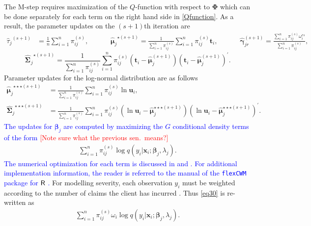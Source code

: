 \documentclass[11pt,letterpaper]{article}
\numberwithin{equation}{section}
\numberwithin{equation}{section}
\numberwithin{equation}{section}
\begin{document}
The M-step requires maximization of the $Q$-function with respect to $\bm \Phi$ which can be done separately for each term on the right hand side in \eqref{Qfunction}. %
As a result, the parameter updates on the $(s+1)$th iteration are
\begin{align*}
{\hat{\tau}_j}^{(s+1)}&=\frac{1}{n} \sum_{i=1}^n \pi_{ij}^{(s)}, && && {\hat{\bm{\mu}}_j}^{\star (s+1)}=\frac{1}{\sum_{i=1}^n \pi_{ij}^{(s)}} \sum_{i=1}^n \pi_{ij}^{(s)}\bm t_i, &&  && {\hat{\bm \gamma}^{(s+1)}_{jr}} =\frac{\sum_{i=1}^n \pi_{ij}^{(s)} \omega^{rs}_i} {\sum_{i=1}^n \pi_{ij}^{(s)}},
\end{align*}
$$
 {\widehat{\bm \Sigma^{}}_j}^{\star(s+1)}=\frac{1}{\sum_{i=1}^n \pi_{ij}^{(s)}} \sum_{i=1}^n \pi_{ij}^{(s)}(\bm t_i-\hat{\bm \mu}^{(s+1)}_j) (\bm t_i-\hat{\bm \mu}^{(s+1)}_j)^{'}.
$$
Parameter updates for the log-normal distribution are as follows
\begin{equation*}\begin{split}
{\hat{\bm \mu}_j}^{\star\star\star (s+1)}&=\frac{1}{\sum_{i=1}^n \pi_{ij}^{(s)}} \sum_{i=1}^n \pi_{ij}^{(s)}\ln \bm u_i,\\
{\widehat{\bm \Sigma}_j}^{\star\star\star(s+1)}&=\frac{1}{\sum_{i=1}^n \pi_{ij}^{(s)}} \sum_{i=1}^n \pi_{ij}^{(s)}(\ln \bm u_i-\hat{\bm \mu}^{\star\star\star(s+1)}_j) (\ln \bm u_i-\hat{\bm \mu}^{\star\star\star(s+1)}_j)^{'}. 
\end{split}\end{equation*}
\textcolor{blue} {The updates for $\bm{\beta}_j$ are computed by maximizing the $G$ conditional density terms of the form  } \textcolor{red}{[Note sure what the previous sen.\ means?]}
\begin{align}
\sum_{i=1}^{n}\pi^{(s)}_{ij} \log{q}(y_i|\bm x_i;\bm \beta_j,\lambda_j).
\label{eq30}
\end{align}
\textcolor{blue}{The numerical optimization for each term is discussed in \cite{Wedel+DeSabro:1995} and \cite{Wedel:2002}.
For additional implementation information, the reader is referred to the manual of the {\tt flexCWM} package \citep{Ingrassia+Punzo+Vittadini+Minotti:2015} for ${\sf R}$ \citep{R18}.
}
For modelling severity, each observation $y_i$ must be weighted according to the number of claims the client has incurred \citep[see pages 118-119][]{frees2015}. Thus \eqref{eq30} is re-written as 
\begin{align}
\sum_{i=1}^{n}\pi^{(s)}_{ij} \mathcal{\omega}_i \log{q}(y_i|\bm x_i;\bm \beta_j,\lambda_j).
\label{eqFrees}
\end{align}
\end{document}

